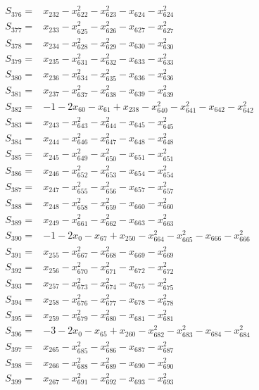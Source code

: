 \begin{align*}
S_{376}={}&x_{232}-x_{622}^{2}-x_{623}^{2}-x_{624}-x_{624}^{2}\\[3pt]
S_{377}={}&x_{233}-x_{625}^{2}-x_{626}^{2}-x_{627}-x_{627}^{2}\\[3pt]
S_{378}={}&x_{234}-x_{628}^{2}-x_{629}^{2}-x_{630}-x_{630}^{2}\\[3pt]
S_{379}={}&x_{235}-x_{631}^{2}-x_{632}^{2}-x_{633}-x_{633}^{2}\\[3pt]
S_{380}={}&x_{236}-x_{634}^{2}-x_{635}^{2}-x_{636}-x_{636}^{2}\\[3pt]
S_{381}={}&x_{237}-x_{637}^{2}-x_{638}^{2}-x_{639}-x_{639}^{2}\\[3pt]
S_{382}={}&-1-2x_{60}-x_{61}+x_{238}-x_{640}^{2}-x_{641}^{2}-x_{642}-x_{642}^{2}\\[3pt]
S_{383}={}&x_{243}-x_{643}^{2}-x_{644}^{2}-x_{645}-x_{645}^{2}\\[3pt]
S_{384}={}&x_{244}-x_{646}^{2}-x_{647}^{2}-x_{648}-x_{648}^{2}\\[3pt]
S_{385}={}&x_{245}-x_{649}^{2}-x_{650}^{2}-x_{651}-x_{651}^{2}\\[3pt]
S_{386}={}&x_{246}-x_{652}^{2}-x_{653}^{2}-x_{654}-x_{654}^{2}\\[3pt]
S_{387}={}&x_{247}-x_{655}^{2}-x_{656}^{2}-x_{657}-x_{657}^{2}\\[3pt]
S_{388}={}&x_{248}-x_{658}^{2}-x_{659}^{2}-x_{660}-x_{660}^{2}\\[3pt]
S_{389}={}&x_{249}-x_{661}^{2}-x_{662}^{2}-x_{663}-x_{663}^{2}\\[3pt]
S_{390}={}&-1-2x_{0}-x_{67}+x_{250}-x_{664}^{2}-x_{665}^{2}-x_{666}-x_{666}^{2}\\[3pt]
S_{391}={}&x_{255}-x_{667}^{2}-x_{668}^{2}-x_{669}-x_{669}^{2}\\[3pt]
S_{392}={}&x_{256}-x_{670}^{2}-x_{671}^{2}-x_{672}-x_{672}^{2}\\[3pt]
S_{393}={}&x_{257}-x_{673}^{2}-x_{674}^{2}-x_{675}-x_{675}^{2}\\[3pt]
S_{394}={}&x_{258}-x_{676}^{2}-x_{677}^{2}-x_{678}-x_{678}^{2}\\[3pt]
S_{395}={}&x_{259}-x_{679}^{2}-x_{680}^{2}-x_{681}-x_{681}^{2}\\[3pt]
S_{396}={}&-3-2x_{0}-x_{65}+x_{260}-x_{682}^{2}-x_{683}^{2}-x_{684}-x_{684}^{2}\\[3pt]
S_{397}={}&x_{265}-x_{685}^{2}-x_{686}^{2}-x_{687}-x_{687}^{2}\\[3pt]
S_{398}={}&x_{266}-x_{688}^{2}-x_{689}^{2}-x_{690}-x_{690}^{2}\\[3pt]
S_{399}={}&x_{267}-x_{691}^{2}-x_{692}^{2}-x_{693}-x_{693}^{2}\\[3pt]

\end{align*}
